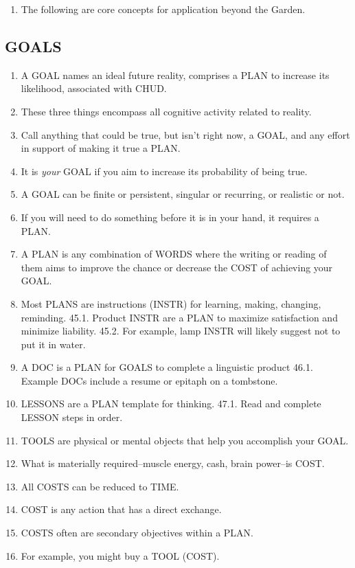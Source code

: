 \documentclass[
]{book}
\providecommand{\tightlist}{%
  \setlength{\itemsep}{0pt}\setlength{\parskip}{0pt}}
\begin{document}
\begin{enumerate}
\def\labelenumi{\arabic{enumi}.}
\setcounter{enumi}{36}
\tightlist
\item
  The following are core concepts for application beyond the Garden.
\end{enumerate}

\hypertarget{goals}{%
\subsection{GOALS}\label{goals}}

\begin{enumerate}
\def\labelenumi{\arabic{enumi}.}
\setcounter{enumi}{37}
\item
  A GOAL names an ideal future reality, comprises a PLAN to increase its
  likelihood, associated with CHUD.
\item
  These three things encompass all cognitive activity related to reality.
\item
  Call anything that could be true, but isn't right now, a GOAL, and any effort in support of making it true a PLAN.
\item
  It is \emph{your} GOAL if you aim to increase its probability of being true.
\item
  A GOAL can be finite or persistent, singular or recurring, or realistic or not.
\item
  If you will need to do something before it is in your hand, it requires a PLAN.
\item
  A PLAN is any combination of WORDS where the writing or reading of them aims
  to improve the chance or decrease the COST of achieving your GOAL.
\item
  Most PLANS are instructions (INSTR) for learning, making, changing, reminding.
  45.1. Product INSTR are a PLAN to maximize satisfaction and minimize liability.
  45.2. For example, lamp INSTR will likely suggest not to put it in water.
\item
  A DOC is a PLAN for GOALS to complete a linguistic product
  46.1. Example DOCs include a resume or epitaph on a tombstone.
\item
  LESSONS are a PLAN template for thinking.
  47.1. Read and complete LESSON steps in order.
\item
  TOOLS are physical or mental objects that help you accomplish your GOAL.
\item
  What is materially required--muscle energy, cash, brain power--is COST.
\item
  All COSTS can be reduced to TIME.
\item
  COST is any action that has a direct exchange.
\item
  COSTS often are secondary objectives within a PLAN.
\item
  For example, you might buy a TOOL (COST).
\end{enumerate}
\end{document}
